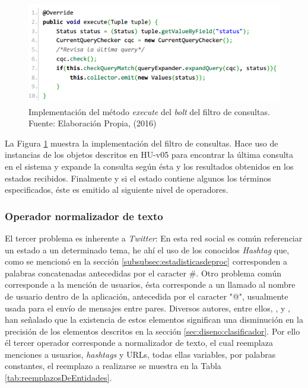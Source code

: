 \begin{figure}[H]
	\centering
	\captionsetup{justification=centering}
	\includegraphics[scale=0.8]{images/FilterBolt.png}
	\caption[Implementación del método \textit{execute} del \textit{bolt} del filtro de consultas.]{Implementación del método \textit{execute} del \textit{bolt} del filtro de consultas.\\Fuente: Elaboración Propia, (2016)}
	\label{fig:operadorFiltro}
\end{figure}

La Figura \ref{fig:operadorFiltro} muestra la implementación del filtro de consultas. Hace uso de instancias de los objetos descritos en HU-v05 para encontrar la última consulta en el sistema y expande la consulta según ésta y los resultados obtenidos en los estados recibidos. Finalmente y si el estado contiene algunos los términos especificados, éste es emitido al siguiente nivel de operadores.

\subsubsection*{Operador normalizador de texto}
\label{subsubsec:3op}

El tercer problema es inherente a \textit{Twitter}: En esta red social es común referenciar un estado a un determinado tema, he ahí el uso de los conocidos \textit{Hashtag} que, como se mencionó en la sección \ref{subsubsec:estadisticasdeproc} corresponden a palabras concatenadas antecedidas por el caracter \#. Otro problema común corresponde a la mención de usuarios, ésta corresponde a un llamado al nombre de usuario dentro de la aplicación, antecedida por el caracter "@", usualmente usada para el envío de mensajes entre pares. Diversos autores, entre ellos, \cite{NLPaccuracy}, \cite{NLPaccuracy1} y \cite{NLPaccuracy2}, han señalado que la existencia de estos elementos significan una disminución en la precisión de los elementos descritos en la sección \ref{sec:diseno:clasificador}. Por ello él tercer operador corresponde a normalizador de texto, el cual reemplaza menciones a usuarios, \textit{hashtags} y URLs, todas ellas variables, por palabras constantes, el reemplazo a realizarse se muestra en la Tabla \ref{tab:reemplazosDeEntidades}.


